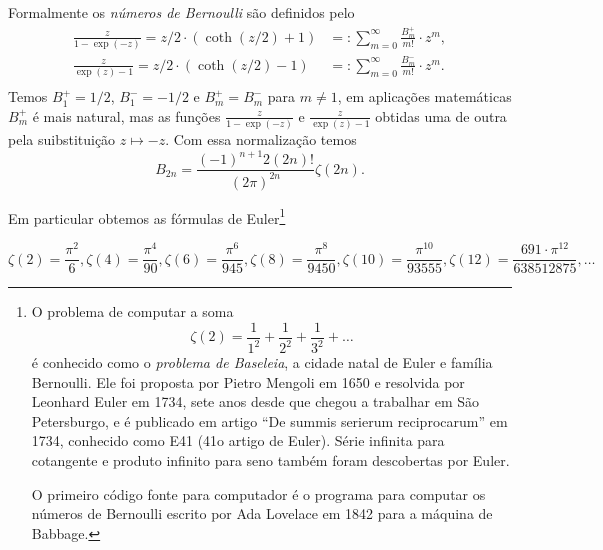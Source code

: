 Formalmente os \emph{números de Bernoulli} são definidos pelo
\begin{align}
\frac{z}{1-\exp(-z)} = z/2 \cdot ( \coth(z/2)+1 ) &=: \sum_{m=0}^\infty \frac{B_m^+}{m!} \cdot z^m, \\
\frac{z}{\exp(z)-1} = z/2 \cdot ( \coth(z/2)-1 ) &=: \sum_{m=0}^\infty \frac{B_m^-}{m!} \cdot z^m. \\
\end{align}
Temos $B_1^+ = 1/2$, $B_1^- = -1/2$ e $B_m^+ = B_m^-$ para $m\neq 1$,
em aplicações matemáticas $B_m^+$ é mais natural,
mas as funções $\frac{z}{1-\exp(-z)}$ e $\frac{z}{\exp(z)-1}$ obtidas uma de outra
pela suibstituição $z\mapsto -z$.
Com essa normalização temos
\begin{equation}
B_{2n} = \frac{(-1)^{n+1} 2 (2n)!}{(2\pi)^{2n}} \zeta(2n).
\end{equation}

Em particular obtemos as fórmulas de Euler\footnote{
O problema de computar a soma
\[ \zeta(2) = \frac{1}{1^2} + \frac{1}{2^2} + \frac{1}{3^2} + \dots \]
é conhecido como o \emph{problema de Baseleia},
a cidade natal de Euler e família Bernoulli.
Ele foi proposta por Pietro Mengoli em 1650 e resolvida
por Leonhard Euler em 1734, sete anos desde que chegou a trabalhar
em São Petersburgo, e é publicado em artigo ``De summis serierum reciprocarum''
em 1734, conhecido como E41 (41o artigo de Euler).
Série infinita para cotangente e produto infinito para seno
também foram descobertas por Euler.

O primeiro código fonte para computador é o programa para computar os números
de Bernoulli escrito por Ada Lovelace em 1842 para a máquina de Babbage.}

\[ \zeta(2)  = \frac{\pi^2}{6},
   \zeta(4)  = \frac{\pi^4}{90},
   \zeta(6)  = \frac{\pi^6}{945},
   \zeta(8)  = \frac{\pi^8}{9450},
   \zeta(10) = \frac{\pi^{10}}{93555},
   \zeta(12) = \frac{691 \cdot \pi^{12}}{638512875},
\dots \]


